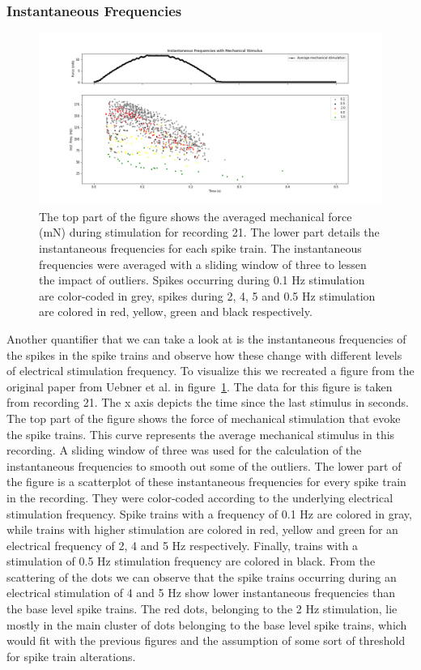 \subsubsection{Instantaneous Frequencies}
\begin{figure}
	\includegraphics[width = \textwidth]{src/pic/11_12_13U1b_inst_freqs}
	\caption{The top part of the figure shows the averaged mechanical force (mN) during stimulation for recording 21. The lower part details the instantaneous frequencies for each spike train. The instantaneous frequencies were averaged with a sliding window of three to lessen the impact of outliers. Spikes occurring during 0.1 Hz stimulation are color-coded in grey, spikes during 2, 4, 5 and 0.5 Hz stimulation are colored in red, yellow, green and black respectively.}
	\label{fig:inst_freqs}
\end{figure}
Another quantifier that we can take a look at is the instantaneous frequencies of the spikes in the spike trains and observe how these change with different levels of electrical stimulation frequency. To visualize this we recreated a figure from the original paper from Uebner et al. in figure~\ref{fig:inst_freqs}. The data for this figure is taken from recording 21. The x axis depicts the time since the last stimulus in seconds. The top part of the figure shows the force of mechanical stimulation that evoke the spike trains. This curve represents the average mechanical stimulus in this recording. A sliding window of three was used for the calculation of the instantaneous frequencies to smooth out some of the outliers. The lower part of the figure is a scatterplot of these instantaneous frequencies for every spike train in the recording. They were color-coded according to the underlying electrical stimulation frequency. Spike trains with a frequency of 0.1 Hz are colored in gray, while trains with higher stimulation are colored in red, yellow and green for an electrical frequency of 2, 4 and 5 Hz respectively. Finally, trains with a stimulation of 0.5 Hz stimulation frequency are colored in black. From the scattering of the dots we can observe that the spike trains occurring during an electrical stimulation of 4 and 5 Hz show lower instantaneous frequencies than the base level spike trains. The red dots, belonging to the 2 Hz stimulation, lie mostly in the main cluster of dots belonging to the base level spike trains, which would fit with the previous figures and the assumption of some sort of threshold for spike train alterations.

